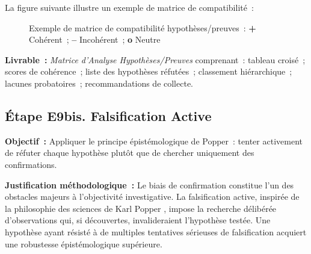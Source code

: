 La figure suivante illustre un exemple de matrice de compatibilité~:

\begin{figure}[H]
\centering
{}
\caption{Exemple de matrice de compatibilité hypothèses/preuves~:
\textbf{+} Cohérent~; \textbf{--} Incohérent~; \textbf{o} Neutre}
\label{fig:matrice-ach}
\end{figure}

\textbf{Livrable~:} \textit{Matrice d'Analyse Hypothèses/Preuves} comprenant~:
tableau croisé~; scores de cohérence~; liste des hypothèses réfutées~;
classement hiérarchique~; lacunes probatoires~; recommandations de collecte.

\subsection{Étape E9bis. Falsification Active}

\textbf{Objectif~:} Appliquer le principe épistémologique de Popper~: tenter
activement de réfuter chaque hypothèse plutôt que de chercher uniquement des
confirmations.

\textbf{Justification méthodologique~:} Le biais de confirmation constitue l'un
des obstacles majeurs à l'objectivité investigative. La falsification active,
inspirée de la philosophie des sciences de Karl Popper \cite{popper1973},
impose la recherche délibérée d'observations qui, si découvertes, invalideraient
l'hypothèse testée. Une hypothèse ayant résisté à de multiples tentatives
sérieuses de falsification acquiert une robustesse épistémologique supérieure.

